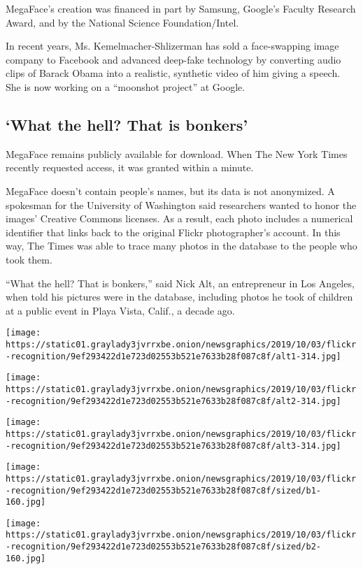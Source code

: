 MegaFace's creation was financed in part by Samsung, Google's Faculty
Research Award, and by the National Science Foundation/Intel.

In recent years, Ms. Kemelmacher-Shlizerman has sold a face-swapping
image company to Facebook and advanced deep-fake technology by
converting audio clips of Barack Obama into a realistic, synthetic video
of him giving a speech. She is now working on a ``moonshot project'' at
Google.

\hypertarget{what-the-hell-that-is-bonkers}{%
\subsection{`What the hell? That is
bonkers'}\label{what-the-hell-that-is-bonkers}}

MegaFace remains publicly available for download. When The New York
Times recently requested access, it was granted within a minute.

MegaFace doesn't contain people's names, but its data is not anonymized.
A spokesman for the University of Washington said researchers wanted to
honor the images' Creative Commons licenses. As a result, each photo
includes a numerical identifier that links back to the original Flickr
photographer's account. In this way, The Times was able to trace many
photos in the database to the people who took them.

``What the hell? That is bonkers,'' said Nick Alt, an entrepreneur in
Los Angeles, when told his pictures were in the database, including
photos he took of children at a public event in Playa Vista, Calif., a
decade ago.

\texttt{[image: https://static01.graylady3jvrrxbe.onion/newsgraphics/2019/10/03/flickr-recognition/9ef293422d1e723d02553b521e7633b28f087c8f/alt1-314.jpg]}

\texttt{[image: https://static01.graylady3jvrrxbe.onion/newsgraphics/2019/10/03/flickr-recognition/9ef293422d1e723d02553b521e7633b28f087c8f/alt2-314.jpg]}

\texttt{[image: https://static01.graylady3jvrrxbe.onion/newsgraphics/2019/10/03/flickr-recognition/9ef293422d1e723d02553b521e7633b28f087c8f/alt3-314.jpg]}

\texttt{[image: https://static01.graylady3jvrrxbe.onion/newsgraphics/2019/10/03/flickr-recognition/9ef293422d1e723d02553b521e7633b28f087c8f/sized/b1-160.jpg]}

\texttt{[image: https://static01.graylady3jvrrxbe.onion/newsgraphics/2019/10/03/flickr-recognition/9ef293422d1e723d02553b521e7633b28f087c8f/sized/b2-160.jpg]}

